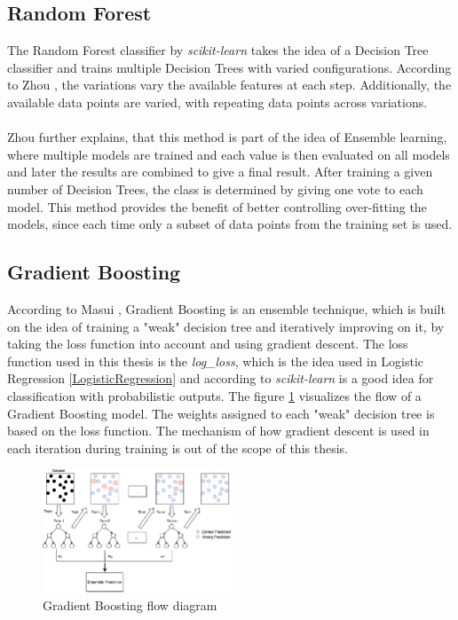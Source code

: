 \subsection{Random Forest}
The Random Forest classifier by \textit{scikit-learn} \parencite{sklearne64:online} takes the idea of a Decision Tree classifier and trains multiple Decision Trees with varied configurations. According to Zhou \parencite{zhou2021machine}, the variations vary the available features at each step. Additionally, the available data points are varied, with repeating data points across variations. 
\\\\
Zhou \parencite{zhou2021machine} further explains, that this method is part of the idea of Ensemble learning, where multiple models are trained and each value is then evaluated on all models and later the results are combined to give a final result. After training a given number of Decision Trees, the class is determined by giving one vote to each model. This method provides the benefit of better controlling over-fitting the models, since each time only a subset of data points from the training set is used. 

\subsection{Gradient Boosting}
According to Masui \parencite{AllYouNe72:online}, Gradient Boosting is an ensemble technique, which is built on the idea of training a "weak" decision tree and iteratively improving on it, by taking the loss function into account and using gradient descent. The loss function used in this thesis is the \textit{log\_loss}, which is the idea used in Logistic Regression \ref{LogisticRegression} and according to \textit{scikit-learn} \parencite{sklearne30:online} is a good idea for classification with probabilistic outputs. The figure \ref{fig:gradientboost} visualizes the flow of a Gradient Boosting model. The weights assigned to each "weak" decision tree is based on the loss function. The mechanism of how gradient descent is used in each iteration during training is out of the scope of this thesis.

\begin{figure}[H]
      \centering
      \includegraphics[width=0.5\textwidth]{images/gradientBoosting.png}
      \caption{Gradient Boosting flow diagram \parencite{gradientBoosting} }
      \label{fig:gradientboost}
  \end{figure}

